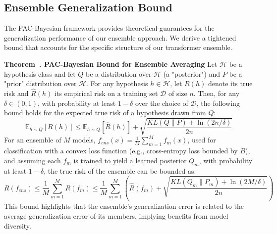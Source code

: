 \documentclass[journal]{IEEEtran}
\newcounter{theorem}
\newenvironment{theorem}[1][]{\refstepcounter{theorem}\par\medskip
   \noindent \textbf{Theorem~\thetheorem. #1} \rmfamily}{\medskip}
\begin{document}
\subsection{Ensemble Generalization Bound}

The PAC-Bayesian framework provides theoretical guarantees for the generalization performance of our ensemble approach. We derive a tightened bound that accounts for the specific structure of our transformer ensemble.

\begin{theorem}[PAC-Bayesian Bound for Ensemble Averaging]
\label{thm:pac_bayes_app}
Let $\mathcal{H}$ be a hypothesis class and let $Q$ be a distribution over $\mathcal{H}$ (a "posterior") and $P$ be a "prior" distribution over $\mathcal{H}$. For any hypothesis $h \in \mathcal{H}$, let $R(h)$ denote its true risk and $\hat{R}(h)$ its empirical risk on a training set $\mathcal{D}$ of size $n$. Then, for any $\delta \in (0,1)$, with probability at least $1-\delta$ over the choice of $\mathcal{D}$, the following bound holds for the expected true risk of a hypothesis drawn from $Q$:
\begin{equation}
\mathbb{E}_{h \sim Q}[R(h)] \leq \mathbb{E}_{h \sim Q}[\hat{R}(h)] + \sqrt{\frac{KL(Q \| P) + \ln(2n/\delta)}{2n}}
\end{equation}
For an ensemble of $M$ models, $f_{ens}(x) = \frac{1}{M} \sum_{m=1}^M f_m(x)$, used for classification with a convex loss function (e.g., cross-entropy loss bounded by $B$), and assuming each $f_m$ is trained to yield a learned posterior $Q_m$, with probability at least $1-\delta$, the true risk of the ensemble can be bounded as:
\begin{equation}
R(f_{ens}) \leq \frac{1}{M} \sum_{m=1}^M R(f_m) \leq \frac{1}{M} \sum_{m=1}^M \left( \hat{R}(f_m) + \sqrt{\frac{KL(Q_m \| P_m) + \ln(2M/\delta)}{2n}} \right)
\end{equation}
This bound highlights that the ensemble's generalization error is related to the average generalization error of its members, implying benefits from model diversity.
\end{theorem}
\end{document}
